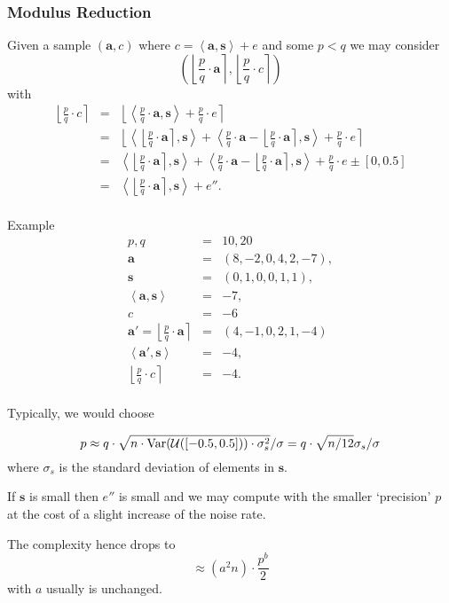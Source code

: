 \documentclass[10pt]{beamer}
\newcommand{\Var}{\ensuremath{\textnormal{Var}}}
\newcommand{\U}[1]{\ensuremath{\mathcal{U}(#1)\xspace}}
\newcommand{\dotp}[2]{\ensuremath{\left\langle {#1},{#2}\right\rangle}\xspace}
\renewcommand{\vec}[1]{\mathbf{#1}\xspace}
\newcommand{\round}[1]{\ensuremath{\left\lfloor{#1}\right\rceil}\xspace}
\begin{document}
\begin{frame}[allowframebreaks]
\frametitle{Modulus Reduction}

Given a sample $(\vec{a},c)$ where $c = \dotp{\vec{a}}{\vec{s}} + e$ and some $p < q $ we may consider $$\left(\round{\frac{p}{q} \cdot \vec{a}}, \round{\frac{p}{q} \cdot c}\right)$$ with
\begin{eqnarray*}
\round{\frac{p}{q} \cdot c} &=& \round{ \dotp{ \frac{p}{q} \cdot \vec{a} }{\vec{s} } + \frac{p}{q} \cdot e}\\
  &=& \round{ \dotp{ \round{ \frac{p}{q} \cdot \vec{a} }}{\vec{s} } + \dotp{\frac{p}{q} \cdot \vec{a} - \round{ \frac{p}{q} \cdot \vec{a} }}{\vec{s}} + \frac{p}{q} \cdot e}\\
  &=& \dotp{ \round{ \frac{p}{q} \cdot \vec{a} }}{\vec{s} } + \dotp{\frac{p}{q} \cdot \vec{a} - \round{ \frac{p}{q} \cdot \vec{a} }}{\vec{s}} + \frac{p}{q} \cdot e \pm [0,0.5]\\
  &=& \dotp{ \round{ \frac{p}{q} \cdot \vec{a} }}{\vec{s} } + e''.\\
\end{eqnarray*}

\framebreak

\begin{exampleblock}{Example}
\begin{eqnarray*}
p, q &=& 10, 20\\
\vec{a} &=& (8, -2, 0, 4, 2, -7),\\
\vec{s} &=& (0, 1, 0, 0, 1, 1),\\
 \dotp{\vec{a}}{\vec{s}} &=& -7,\\
c &=& -6\\
\vec{a'} = \round{\frac{p}{q} \cdot \vec{a}} &=& (4, -1, 0, 2, 1, -4)\\
\dotp{\vec{a'}}{\vec{s}} &=& -4,\\
\round{\frac{p}{q} \cdot c} &=& -4.\\
\end{eqnarray*}
\end{exampleblock}


\framebreak

Typically, we would choose

$$p \approx q \cdot \sqrt{n \cdot \Var(\U{[-0.5,0.5]}) \cdot \sigma^2_s}/\sigma = q \cdot \sqrt{n/12} \sigma_s/\sigma$$ where $\sigma_s$ is the standard deviation of elements in $\vec{s}$.

\vspace{1em}

If $\vec{s}$ is small then $e''$ is small and we may compute with the smaller `precision' $p$ at the cost of a slight increase of the noise rate. 

\vspace{1em}

The complexity hence drops to $$\approx (a^2n)\cdot\frac{p^b}{2}$$ with $a$ usually is unchanged.
\end{frame}
\end{document}

